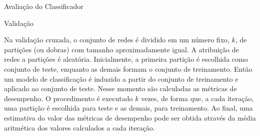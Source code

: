 \begin{section}{Avaliação do Classificador}
\begin{subsection}{Validação}


		Na validação cruzada, o conjunto de redes é dividido em um número fixo, $k$, de partições (ou dobras) com tamanho aproximadamente igual. A atribuição de redes a partições é aleatória. Inicialmente, a primeira partição é escolhida como conjunto de teste, enquanto as demais formam o conjunto de treinamento. Então um modelo de classificação é induzido a partir do conjunto de treinamento e aplicado ao conjunto de teste. Nesse momento são calculadas as métricas de desempenho. O procedimento é executado $k$ vezes, de forma que, a cada iteração, uma partição é escolhida para teste e as demais, para treinamento. Ao final, uma estimativa do valor das métricas de desempenho pode ser obtida através da média aritmética dos valores calculados a cada iteração.


\end{subsection}
\end{section}
